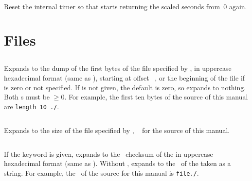 \documentclass{pdftexmanual}
\begin{document}
Reset the internal timer so that 
starts returning the scaled seconds from~0 again. 

\section{Files}

\subsection{}

Expands to the dump of the first   bytes
of the file specified by , in uppercase
hexadecimal format (same as ), starting at offset
~, or the beginning of the file if
 is zero or not specified. If  is not given,
the default is zero, so expands to nothing. Both s
must be $\ge0$. For example, the first ten bytes of the source of this
manual are {\tt\pdffiledump length 10 {./\jobname}}.

\subsection{}

Expands to the size of the file specified by ,
\eg\ {\tt {}} for the source of this manual.

\subsection{}

If the keyword  is given, expands to the \MDFIVE\ checksum of
the  in uppercase hexadecimal format (same as
). Without , expands to the \MDFIVE\ of the
 taken as a string. For example, the \MDFIVE\ of
the source for this manual is {\tt \pdfmdfivesum file{./\jobname}}.
\end{document}
